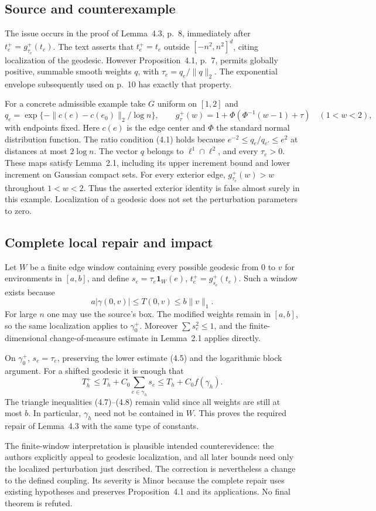 \documentclass[10pt]{article}
\begin{document}
\subsection*{Source and counterexample}
The issue occurs in the proof of Lemma 4.3, p. 8, immediately after \(t_e^+=g_{\tau_e}^+(t_e)\). The text asserts that \(t_e^+=t_e\) outside \([-n^2,n^2]^d\), citing localization of the geodesic. However Proposition 4.1, p. 7, permits globally positive, summable smooth weights \(q\), with \(\tau_e=q_e/\|q\|_2\). The exponential envelope subsequently used on p. 10 has exactly that property.\par
For a concrete admissible example take \(G\) uniform on \([1,2]\) and \[q_e=\exp\{-\|c(e)-c(e_0)\|_2/\log n\},\qquad
 g_\tau^+(w)=1+\Phi\!\left(\Phi^{-1}(w-1)+\tau\right)
 \quad(1<w<2),\] with endpoints fixed. Here \(c(e)\) is the edge center and \(\Phi\) the standard normal distribution function. The ratio condition (4.1) holds because \(e^{-2}\leq q_e/q_{e'}\leq e^2\) at distances at most \(2\log n\). The vector \(q\) belongs to \(\ell^1\cap\ell^2\), and every \(\tau_e>0\). These maps satisfy Lemma 2.1, including its upper increment bound and lower increment on Gaussian compact sets. For every exterior edge, \(g_{\tau_e}^+(w)>w\) throughout \(1<w<2\). Thus the asserted exterior identity is false almost surely in this example. Localization of a geodesic does not set the perturbation parameters to zero.\par
\subsection*{Complete local repair and impact}
Let \(W\) be a finite edge window containing every possible geodesic from \(0\) to \(v\) for environments in \([a,b]\), and define \(s_e=\tau_e\mathbf1_W(e)\), \(t_e^+=g_{s_e}^+(t_e)\). Such a window exists because \[a|\gamma(0,v)|\leq T(0,v)\leq b\|v\|_1.\] For large \(n\) one may use the source’s box. The modified weights remain in \([a,b]\), so the same localization applies to \(\gamma_0^+\). Moreover \(\sum s_e^2\leq1\), and the finite-dimensional change-of-measure estimate in Lemma 2.1 applies directly.\par
On \(\gamma_0^+\), \(s_e=\tau_e\), preserving the lower estimate (4.5) and the logarithmic block argument. For a shifted geodesic it is enough that \[T_h^+\leq T_h+C_0\sum_{e\in\gamma_h}s_e
          \leq T_h+C_0 f(\gamma_h).\] The triangle inequalities (4.7)–(4.8) remain valid since all weights are still at most \(b\). In particular, \(\gamma_h\) need not be contained in \(W\). This proves the required repair of Lemma 4.3 with the same type of constants.\par
The finite-window interpretation is plausible intended counterevidence: the authors explicitly appeal to geodesic localization, and all later bounds need only the localized perturbation just described. The correction is nevertheless a change to the defined coupling. Its severity is Minor because the complete repair uses existing hypotheses and preserves Proposition 4.1 and its applications. No final theorem is refuted.\par
\end{document}
